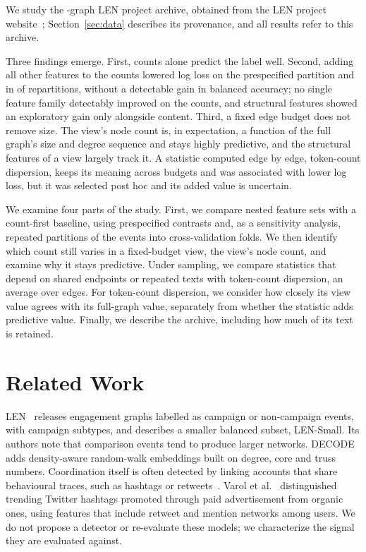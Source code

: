 \documentclass[conference]{IEEEtran}
\begin{document}
We study the \RNEvents-graph LEN project archive, obtained from the LEN project website~\cite{repo}; Section~\ref{sec:data} describes its provenance, and all results refer to this archive.

Three findings emerge. First, counts alone predict the label well. Second, adding all other features to the counts lowered log loss on the prespecified partition and in \RTwCOneFav{} of \RNPartitions{} repartitions, without a detectable gain in balanced accuracy; no single feature family detectably improved on the counts, and structural features showed an exploratory gain only alongside content. Third, a fixed edge budget does not remove size. The view's node count is, in expectation, a function of the full graph's size and degree sequence and stays highly predictive, and the structural features of a view largely track it. A statistic computed edge by edge, token-count dispersion, keeps its meaning across budgets and was associated with lower log loss, but it was selected post hoc and its added value is uncertain.

We examine four parts of the study. First, we compare nested feature sets with a count-first baseline, using prespecified contrasts and, as a sensitivity analysis, repeated partitions of the events into cross-validation folds. We then identify which count still varies in a fixed-budget view, the view's node count, and examine why it stays predictive. Under sampling, we compare statistics that depend on shared endpoints or repeated texts with token-count dispersion, an average over edges. For token-count dispersion, we consider how closely its view value agrees with its full-graph value, separately from whether the statistic adds predictive value. Finally, we describe the archive, including how much of its text is retained.

\section{Related Work}\label{sec:related}
LEN~\cite{len} releases engagement graphs labelled as campaign or non-campaign events, with campaign subtypes, and describes a smaller balanced subset, LEN-Small. Its authors note that comparison events tend to produce larger networks. DECODE~\cite{decode} adds density-aware random-walk embeddings built on degree, core and truss numbers. Coordination itself is often detected by linking accounts that share behavioural traces, such as hashtags or retweets~\cite{pacheco}. Varol et al.~\cite{varol} distinguished trending Twitter hashtags promoted through paid advertisement from organic ones, using features that include retweet and mention networks among users. We do not propose a detector or re-evaluate these models; we characterize the signal they are evaluated against.
\end{document}
